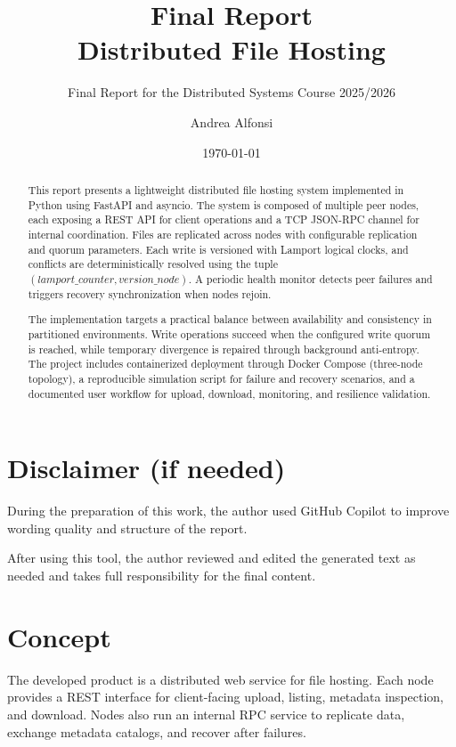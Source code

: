 \documentclass{scrartcl}
\title{\LARGE
  Final Report\\
    Distributed File Hosting
}
\subtitle{Final Report for the Distributed Systems Course 2025/2026}
\author{
    Andrea Alfonsi \\ \emailaddr{andrea.alfonsi3@studio.unibo.it}
}
\date{\today}
\begin{document}
\maketitle

\begin{abstract}
This report presents a lightweight distributed file hosting system implemented in Python using FastAPI and asyncio. The system is composed of multiple peer nodes, each exposing a REST API for client operations and a TCP JSON-RPC channel for internal coordination. Files are replicated across nodes with configurable replication and quorum parameters. Each write is versioned with Lamport logical clocks, and conflicts are deterministically resolved using the tuple $(lamport\_counter, version\_node)$. A periodic health monitor detects peer failures and triggers recovery synchronization when nodes rejoin.

The implementation targets a practical balance between availability and consistency in partitioned environments. Write operations succeed when the configured write quorum is reached, while temporary divergence is repaired through background anti-entropy. The project includes containerized deployment through Docker Compose (three-node topology), a reproducible simulation script for failure and recovery scenarios, and a documented user workflow for upload, download, monitoring, and resilience validation.
\end{abstract}

\section*{Disclaimer (if needed)}

During the preparation of this work, the author used GitHub Copilot to improve wording quality and structure of the report.

After using this tool, the author reviewed and edited the generated text as needed and takes full responsibility for the final content.

\section{Concept}\label{concept}

The developed product is a distributed web service for file hosting. Each node provides a REST interface for client-facing upload, listing, metadata inspection, and download. Nodes also run an internal RPC service to replicate data, exchange metadata catalogs, and recover after failures.
\end{document}
